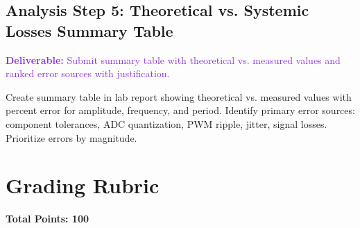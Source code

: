 \documentclass[11pt,letterpaper]{article}
\providecommand{\delECE}[1]{\textcolor{BlueViolet}{\textbf{Deliverable:} #1}}
\begin{document}
\subsection{Analysis Step 5: Theoretical vs. Systemic Losses Summary Table}

\delECE{Submit summary table with theoretical vs. measured values and ranked error sources with justification.}

Create summary table in lab report showing theoretical vs. measured values with percent error for amplitude, frequency, and period. Identify primary error sources: component tolerances, ADC quantization, PWM ripple, jitter, signal losses. Prioritize errors by magnitude.

\clearpage

\section{Grading Rubric}

\noindent
\textbf{Total Points: 100}
\end{document}
